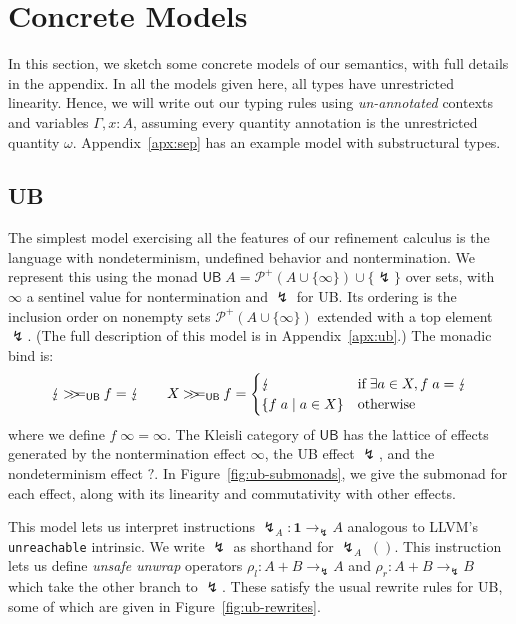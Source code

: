 \documentclass[acmsmall,screen,review]{acmart}
\newcommand{\mc}[1]{\ensuremath{\mathcal{#1}}}
\newcommand{\mb}[1]{\ensuremath{\mathbf{#1}}}
\newcommand{\ms}[1]{\ensuremath{\mathsf{#1}}}
\newcommand{\topq}{\omega}
\newcommand{\ubeff}{\lightning}
\newcommand{\obind}{\mathbin{>\!\!>\mkern-6.7mu=}}
\newcommand{\mbind}[3]{#2 \obind_{#1} #3}
\begin{document}
\section{Concrete Models}

In this section, we sketch some concrete models of our semantics, with full details in the appendix.
In all the models given here, all types have unrestricted linearity. Hence, we will write out our
typing rules using \emph{un-annotated} contexts and variables $\Gamma, x: A$, assuming every
quantity annotation is the unrestricted quantity $\topq$. Appendix~\ref{apx:sep} has an example
model with substructural types.

\subsection{UB}

The simplest model exercising all the features of our refinement calculus is the language with
nondeterminism, undefined behavior and nontermination. We represent this using the monad $\ms{UB}\;A
= \mc{P}^+(A \cup \{\infty\}) \cup \{\ubeff\}$ over sets, with $\infty$ a sentinel value for
nontermination and $\ubeff$ for UB. Its ordering is the inclusion order on nonempty sets $\mc{P}^+(A
\cup \{\infty\})$ extended with a top element $\ubeff$. (The full description of this model is in
Appendix~\ref{apx:ub}.) The monadic bind is:
$$
\mbind{\ms{UB}}{\ubeff}{f} = \ubeff \qquad
\mbind{\ms{UB}}{X}{f} = \begin{cases}
  \ubeff & \text{if}\;\exists a \in X, f\;a = \ubeff \\
  \{f\;a \mid a \in X\} & \text{otherwise}
\end{cases}
$$
where we define $f\;\infty = \infty$. 
%
The Kleisli category of $\ms{UB}$ has the lattice of effects generated by the nontermination effect
$\infty$, the UB effect $\ubeff$, and the nondeterminism effect $?$. In
Figure~\ref{fig:ub-submonads}, we give the submonad for each effect, along with its linearity and
commutativity with other effects.

This model lets us interpret instructions $\ubeff_A: \mb{1} \to_\ubeff A$ analogous to LLVM's
\texttt{unreachable} intrinsic. We write $\ubeff$ as shorthand for 
$\ubeff_A\;()$. This instruction lets us define \emph{unsafe unwrap} operators
$\rho_l : A + B \to_\ubeff A$ and $\rho_r : A + B \to_\ubeff B$
which take the other branch to $\ubeff$.
%
These satisfy the usual rewrite rules for UB, some of which are given in 
Figure~\ref{fig:ub-rewrites}.
\end{document}
